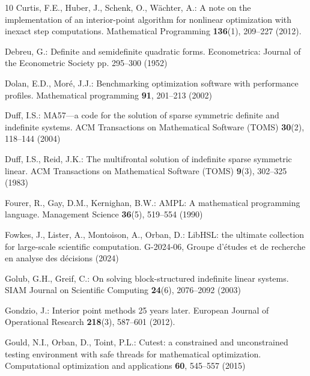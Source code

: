 \documentclass[smallextended]{svjour3}
\begin{document}
\begin{thebibliography}{10}
Curtis, F.E., Huber, J., Schenk, O., W{\"a}chter, A.: A note on the implementation of an interior-point algorithm for nonlinear optimization with inexact step computations.
\newblock Mathematical Programming \textbf{136}(1), 209--227 (2012).
\newblock {}

Debreu, G.: Definite and semidefinite quadratic forms.
\newblock Econometrica: Journal of the Econometric Society pp. 295--300 (1952)

Dolan, E.D., Mor{\'e}, J.J.: Benchmarking optimization software with performance profiles.
\newblock Mathematical programming \textbf{91}, 201--213 (2002)

Duff, I.S.: {MA57}---a code for the solution of sparse symmetric definite and indefinite systems.
\newblock ACM Transactions on Mathematical Software (TOMS) \textbf{30}(2), 118--144 (2004)

Duff, I.S., Reid, J.K.: The multifrontal solution of indefinite sparse symmetric linear.
\newblock ACM Transactions on Mathematical Software (TOMS) \textbf{9}(3), 302--325 (1983)

Fourer, R., Gay, D.M., Kernighan, B.W.: {AMPL: A mathematical programming language}.
\newblock Management Science \textbf{36}(5), 519--554 (1990)

Fowkes, J., Lister, A., Montoison, A., Orban, D.: {LibHSL: the ultimate collection for large-scale scientific computation}.
 G-2024-06, Groupe d’études et de recherche en analyse des décisions (2024)

Golub, G.H., Greif, C.: On solving block-structured indefinite linear systems.
\newblock SIAM Journal on Scientific Computing \textbf{24}(6), 2076--2092 (2003)

Gondzio, J.: Interior point methods 25 years later.
\newblock European Journal of Operational Research \textbf{218}(3), 587--601 (2012).
\newblock {}

Gould, N.I., Orban, D., Toint, P.L.: Cutest: a constrained and unconstrained testing environment with safe threads for mathematical optimization.
\newblock Computational optimization and applications \textbf{60}, 545--557 (2015)


\end{thebibliography}
\end{document}
